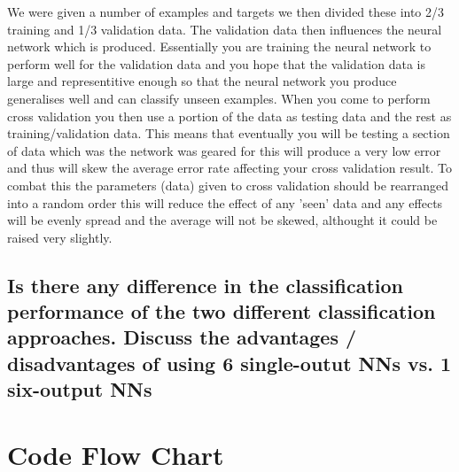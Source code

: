 \documentclass[11pt]{article}
\begin{document}
We were given a number of examples and targets we then divided these into  2/3 training and 1/3 validation data. The validation data then influences the neural network which is produced. Essentially you are training the neural network to perform well for the validation data and you hope that the validation data is large and representitive enough so that the neural network you produce generalises well and can classify unseen examples. When you come to perform cross validation you then use a portion of the data as testing data and the rest as training/validation data. This means that eventually you will be testing a section of data which was the network was geared for this will produce a very low error and thus will skew the average error rate affecting your cross validation result. To combat this the parameters (data) given to cross validation should be rearranged into a random order this will reduce the effect of any 'seen' data and any effects will be evenly spread and the average will not be skewed, althought it could be raised very slightly.

\subsection{Is there any difference in the classification performance of the two different classification approaches. Discuss the advantages / disadvantages of using 6 single-outut NNs vs. 1 six-output NNs}



\section{Code Flow Chart}
\end{document}
